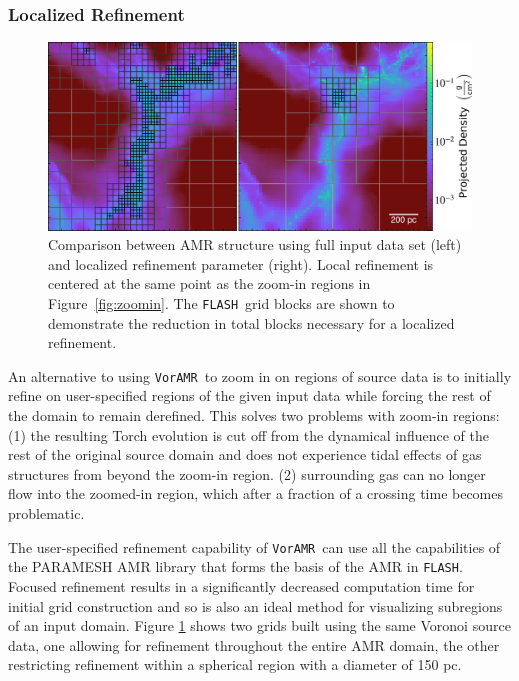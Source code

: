 \documentclass[twoside]{drexel-thesis}
\newcommand\voramr{\texttt{VorAMR}}
\newcommand\flash{\texttt{FLASH}}
\begin{document}
\begin{thesis}
\subsubsection{Localized Refinement}
\begin{figure}[!htb]
    \includegraphics[width=\columnwidth]{roi-comparison-cropped.png}
    \caption{Comparison between AMR structure using full input data set (left) and localized refinement parameter (right). Local refinement is centered at the same point as the zoom-in regions in Figure~\ref{fig:zoomin}. The \flash~grid blocks are shown to demonstrate the reduction in total blocks necessary for a localized refinement.}
    \label{fig:localref}
\end{figure}

An alternative to using \voramr~to zoom in on regions of source data is to initially refine on user-specified regions of the given input data while forcing the rest of the domain to remain derefined. This solves two problems with zoom-in regions: (1) the resulting Torch evolution is cut off from the dynamical influence of the rest of the original source domain and does not experience tidal effects of gas structures from beyond the zoom-in region. (2)  surrounding gas can no longer flow into the zoomed-in region, which after a fraction of a crossing time becomes problematic. 


The user-specified refinement capability of \voramr~can use all the capabilities of the PARAMESH AMR library \citep{macneice_PARAMESH_2000} that forms the basis of the AMR in \flash. Focused refinement results in a significantly decreased computation time for initial grid construction and so is also an ideal method for visualizing subregions of an input domain. Figure \ref{fig:localref} shows two grids built using the same Voronoi source data, one allowing for refinement throughout the entire AMR domain, the other restricting refinement within a spherical region with a diameter of 150 pc. 


\end{thesis}
\end{document}
